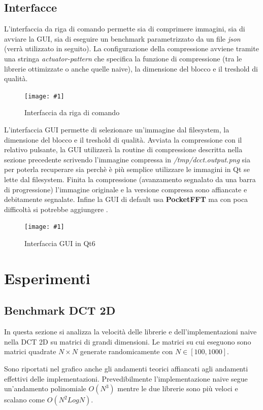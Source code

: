 \documentclass[a4paper,11pt,oneside, table]{article}
\newcommand{\putimage}[4] {
	\begin{figure}[H]
	    \centering
	    \texttt{[image: \#1]}
	    \caption{#2}\label{#3}
	\end{figure}
}
\begin{document}
\pagebreak

\subsection{Interfacce}

L'interfaccia da riga di comando permette sia di comprimere immagini, sia di avviare la GUI, sia di eseguire un benchmark parametrizzato da un file \textit{json} (verr\`a utilizzato in seguito).
La configurazione della compressione avviene tramite una stringa \textit{actuator-pattern} che specifica la funzione di compressione (tra le librerie ottimizzate o anche quelle naive), la dimensione del blocco e il treshold di qualit\`a.

\putimage{images/interface-cli.png}{Interfaccia da riga di comando}{png:interface_cli}{0.99}

L'interfaccia GUI permette di selezionare un'immagine dal filesystem, la dimensione del blocco e il treshold di qualit\`a.
Avviata la compressione con il relativo pulsante, la GUI utilizzer\`a la routine di compressione descritta nella sezione precedente scrivendo l'immagine compressa in \textit{/tmp/dcct.output.png} sia per poterla recuperare sia perch\`e \`e pi\`u semplice utilizzare le immagini in Qt se lette dal filesystem.
Finita la compressione (avanzamento segnalato da una barra di progressione) l'immagine originale e la versione compressa sono affiancate e debitamente segnalate.
Infine la GUI di default usa \textbf{PocketFFT} ma con poca difficolt\`a si potrebbe aggiungere .

\putimage{images/interface-gui.png}{Interfaccia GUI in Qt6}{png:interface_gui}{0.99}

\section{Esperimenti}

\subsection{Benchmark DCT 2D}

In questa sezione si analizza la velocit\`a delle librerie e dell'implementazioni naive nella DCT 2D su matrici di grandi dimensioni.
Le matrici su cui eseguono sono matrici quadrate $N \times N$ generate randomicamente con $N \in [100, 1000]$.

Sono riportati nel grafico anche gli andamenti teorici affiancati agli andamenti effettivi delle implementazioni.
Prevedibilmente l'implementazione naive segue un'andamento polinomiale $O(N^3)$ mentre le due librerie sono pi\`u veloci e scalano come $O(N^2 Log N)$.
\end{document}
